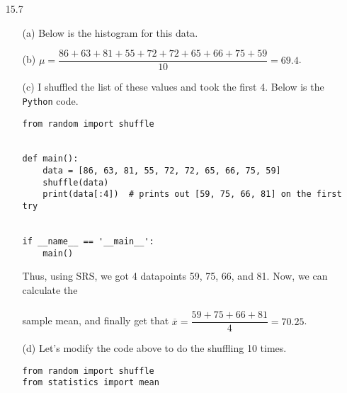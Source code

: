\documentclass[11pt, a4paper]{article}
\begin{document}
\begin{itemize}
\item[15.7]
\begin{itemize}
\item[(a)]
Below is the histogram for this data.
\begin{center}
\end{center}

\item[]

\item[(b)]
$\mu = \dfrac{86 + 63 + 81 + 55 + 72 + 72 + 65 + 66 + 75 + 59}{10} = 69.4$.

\item[]

\item[(c)]
I shuffled the list of these values and took the first 4.
Below is the \texttt{Python} code.

\item[]
\item[]
\begin{verbatim}
from random import shuffle


def main():
    data = [86, 63, 81, 55, 72, 72, 65, 66, 75, 59]
    shuffle(data)
    print(data[:4])  # prints out [59, 75, 66, 81] on the first try


if __name__ == '__main__':
    main()
\end{verbatim}
\item[]
\item[]

Thus, using SRS, we got 4 datapoints 59, 75, 66, and 81.
Now, we can calculate the\\\\
sample mean, and finally get that $\overline{x} = \dfrac{59 + 75 + 66 + 81}{4} = 70.25$.

\item[]

\item[(d)]
Let's modify the code above to do the shuffling 10 times.

\item[]
\item[]
\begin{verbatim}
from random import shuffle
from statistics import mean
    

\end{verbatim}
\end{itemize}
\end{itemize}
\end{document}
